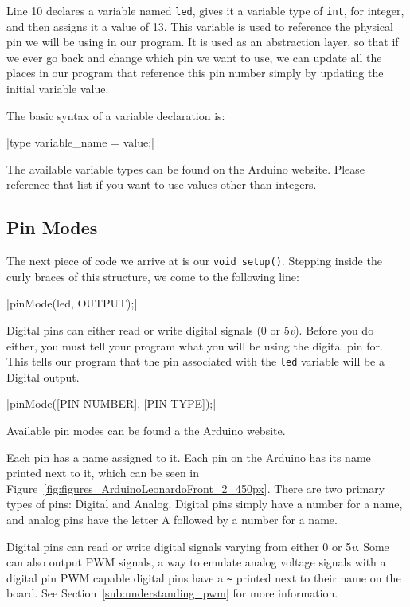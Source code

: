 \documentclass[11pt,a4paper]{article}
\begin{document}
Line 10 declares a variable named \texttt{led}, gives it a variable type of \texttt{int}, for integer, and then assigns it a value of 13.  This variable is used to reference the physical pin we will be using in our program.  It is used as an abstraction layer, so that if we ever go back and change which pin we want to use, we can update all the places in our program that reference this pin number simply by updating the initial variable value.

The basic syntax of a variable declaration is: 

|type variable_name = value;|

The available variable types can be found on the Arduino website.\cite{ard_ref}  Please reference that list if you want to use values other than integers.


\subsection{Pin Modes} %
\label{sub:pin_modes}

The next piece of code we arrive at is our \texttt{void setup()}.  Stepping inside the curly braces of this structure, we come to the following line:

|pinMode(led, OUTPUT);|

Digital pins can either read or write digital signals (0 or 5\emph{v}).  Before you do either, you must tell your program what you will be using the digital pin for.  This tells our program that the pin associated with the \texttt{led} variable will be a Digital output.

|pinMode([PIN-NUMBER], [PIN-TYPE]);|

Available pin modes can be found a the Arduino website.\cite{pin_mode}

Each pin has a name assigned to it.  Each pin on the Arduino has its name printed next to it, which can be seen in Figure~\ref{fig:figures_ArduinoLeonardoFront_2_450px}.  There are two primary types of pins:  Digital and Analog.  Digital pins simply have a number for a name, and analog pins have the letter A followed by a number for a name.

Digital pins can read or write digital signals varying from either 0 or 5\emph{v}.  Some can also output PWM signals, a way to emulate analog voltage signals with a digital pin PWM capable digital pins have a \texttt{\~} printed next to their name on the board.  See Section~\ref{sub:understanding_pwm} for more information.
\end{document}
